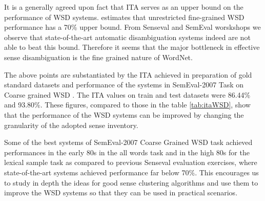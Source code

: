 It is a generally agreed upon fact that ITA serves as an upper bound on the performance of WSD systems. \citep{Navigli06meaningfulclustering} estimates that unrestricted fine-grained WSD performance has a 70\% upper bound.  From Senseval and SemEval worskshops we observe that state-of-the-art automatic disambiguation systems indeed are not able to beat this bound. Therefore it seems that the major bottleneck in effective sense disambiguation is the fine grained nature of WordNet.

The above points are substantiated by the ITA achieved in preparation of gold standard datasets and performance of the systems in SemEval-2007 Task on Coarse grained WSD \citep{navigli-litkowski:SemEval-2007}. The ITA values on train and test datasets were 86.44\% and 93.80\%. These figures, compared to those in the table \ref{tab:itaWSD}, show that the performance of the WSD systems can be improved by changing the granularity of the adopted sense inventory.

Some of the best systems of SemEval-2007 Coarse Grained WSD task achieved performances in the early 80s in the all words task and in the high 80s for the lexical sample task as compared to previous Senseval evaluation exercises, where state-of-the-art systems achieved performance far below 70\%. This encourages us to study in depth the ideas for good sense clustering algorithms and use them to improve the WSD systems so that they can be used in practical scenarios.

\begin{comment}
To understand the granularity of WordNet, lets take an example.
\begin{example}
Consider the senses of the word \textit{evidence} as a \textit{noun} from WordNet version 3.1\footnote{Online WordNet Search: \url{http://wordnetweb.princeton.edu/perl/webwn}} in the table \ref{tab:evidenceExample}.
For most of the applications the sense distinctions are too-fine and are not required. 
One might say that they are all clearly related. \cite{mccarthy2006relating}
\begin{table}[h]
\centering
\begin{tabular}{ | l | p{12cm} |} 
\hline
WordNet Sense & Gloss \\ \hline
evidence\#n\#1 & evidence, grounds (your basis for belief or disbelief; knowledge on which to base belief)  ``the evidence that smoking causes lung cancer is very compelling`` \\ \hline
evidence\#n\#2 & evidence (an indication that makes something evident) ''his trembling was evidence of his fear'' \\ \hline
evidence\#n\#3 & evidence ((law) all the means by which any alleged matter of fact whose truth is investigated at judicial trial is established or disproved) \\ \hline    
\end{tabular}
\caption{Senses of the word \textit{evidence}} 
\label{tab:evidenceExample}
\end{table}
\end{example}
\end{comment}

